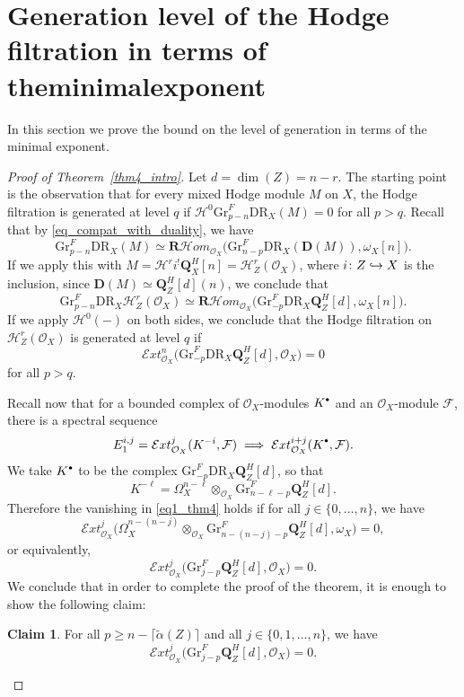 \documentclass[JEP,XML,SOM,Unicode]{cedram}
\newcommand\hto{\mathrel{\lhook\joinrel\to}}
\newcommand{\sbullet}{{\scriptscriptstyle\bullet}}
\newcommand{\csbullet}{{\raisebox{1pt}{$\sbullet$}}}
\theoremstyle{plain}
\theoremstyle{definition}
\newtheorem{claim}[thm]{Claim}
\newcommand\Q{{\mathbf Q}}
\newcommand\R{{\mathbf R}}
\newcommand\cE{\mathcal{E}}
\newcommand\cF{\mathcal{F}}
\newcommand\cH{\mathcal{H}}
\newcommand\cO{\mathcal{O}}
\newcommand\cH{\mathcal{H}}
\newcommand\cO{\mathcal{O}}
\newcommand\gr{\mathrm{Gr}}
\newcommand\DR{\mathrm{DR}}
\begin{document}
\section{Generation level of the Hodge filtration in terms of the\nobreakspace minimal\nobreakspace exponent}\label{section4}

In this section we prove the bound on the level of generation in terms of the minimal exponent.

\begin{proof}[Proof of Theorem~\ref{thm4_intro}]
Let $d=\dim(Z)=n-r$.
The starting point is the observation that for every mixed Hodge module $M$ on $X$, the Hodge filtration is generated at level $q$ if $\cH^0 \gr^F_{p-n} \DR_X(M) = 0$ for all $p >q$. Recall that by \eqref{eq_compat_with_duality}, we have
\[ \gr^F_{p-n} \DR_X(M)\simeq \R\cH om_{\cO_X}\big(\gr^F_{n-p}\DR_X(\mathbf D(M)),\omega_X[n]\big).\]
If we apply this with $M=\cH^ri^!\Q_X^H[n]=\cH^r_Z(\cO_X)$, where $i\colon Z\hto X$ is the inclusion,
since ${\mathbf D}(M)\simeq \Q^H_Z[d](n)$, we conclude that
\[ \gr^F_{p-n} \DR_X \cH^r_Z(\cO_X) \simeq \R\cH om_{\cO_X}\big(\gr^F_{-p}\DR_X\Q_Z^H[d],\omega_X[n]\big).\]
If we apply $\cH^0(-)$ on both sides, we conclude that the Hodge filtration on $\cH^r_Z(\cO_X)$ is generated at level $q$ if
\begin{equation}\label{eq1_thm4}
\cE xt^n_{\cO_X}\big(\gr^F_{-p} \DR_X\Q_Z^H[d],\cO_X\big) = 0
\end{equation}
for all $p>q$.

Recall now that for a bounded complex of $\cO_X$-modules $K^\csbullet$ and an $\cO_X$-module $\cF$,
there is a spectral sequence
\[ E_1^{i,j} = \cE xt_{\cO_X}^j(K^{-i},\cF) \implies \cE xt^{i+j}_{\cO_X}(K^\csbullet,\cF).\]
We take $K^{\csbullet}$ to be the complex $\gr^F_{-p}\DR_X\Q_Z^H[d]$, so that
\[K^{-\ell}=\Omega_X^{n-\ell}\otimes_{\cO_X}\gr^F_{n-\ell-p}\Q_Z^H[d].\]
Therefore the vanishing in \eqref{eq1_thm4} holds if
for all $j\in\{0,\ldots,n\}$, we have\vspace*{-3pt}
\[ \cE xt_{\cO_X}^j \big(\Omega_X^{n-(n-j)}\otimes_{\cO_X}\gr^F_{n-(n-j)-p}\Q_Z^H[d],\omega_X\big)=0,\]
or equivalently,\vspace*{-3pt}
\[ \cE xt_{\cO_X}^j \big(\gr^F_{j-p}\Q_Z^H[d], \cO_X\big) = 0.\]
We conclude that in order to complete the proof of the theorem, it is enough to show
the following claim:
\begin{claim} For all $p \geq n - \lceil \widetilde{\alpha}(Z) \rceil$ and all $j\in \{0,1,\dots, n\}$, we have\vspace*{-3pt}
\begin{equation}\label{eq_claim}
\cE xt_{\cO_X}^j \big(\gr^F_{j-p}\Q_Z^H[d], \cO_X\big) = 0.
\end{equation}
\end{claim}


\end{proof}
\end{document}
